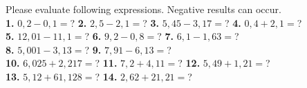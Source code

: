 \documentclass[a4paper]{article}
\begin{document}
\begin{Large}

Please evaluate following expressions. Negative results can occur. \\[0.75cm]

\textbf{1.} $0,2 - 0,1=$? \hspace{0.3cm}
\textbf{2.} $2,5 - 2,1=$? \hspace{0.3cm}
\textbf{3.} $5,45 - 3,17=$? \hspace{0.3cm}
\textbf{4.} $0,4 + 2,1=$? \\[0.75cm]

		
\textbf{5.} $12,01 - 11,1=$? \hspace{0.3cm}
\textbf{6.} $9,2- 0,8=$? \hspace{0.3cm}
\textbf{7.} $6,1 - 1,63=$? \\[0.75cm]
\textbf{8.} $5,001 - 3,13=$? \hspace{0.3cm}
\textbf{9.} $7,91 - 6,13=$? \\[0.75cm]
	

\textbf{10.} $6,025 + 2,217=$? \hspace{0.3cm}
\textbf{11.} $7,2 + 4,11=$? \hspace{0.3cm}
\textbf{12.} $5,49 + 1,21=$? \\[0.75cm]
\textbf{13.} $5,12 + 61,128=$? \hspace{0.3cm}
\textbf{14.} $2,62 + 21,21=$? \hspace{0.3cm}

\end{Large}
\end{document}
